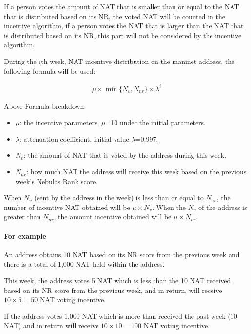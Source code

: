 If a person votes the amount of NAT that is smaller than or equal to the NAT that is distributed based on its NR, the voted NAT will be counted in the incentive algorithm, if a person votes the NAT that is larger than the NAT that is distributed based on its NR, this part will not be considered by the incentive algorithm.

During the $i$th week, NAT incentive distribution on the maninet address, the following formula will be used:

\begin{align}
\mu \times \min \{N_{v}, N_{nr}\} \times \lambda^{i}
\end{align}

Above Formula breakdown:

\begin{itemize}
	\item $\mu$: the incentive parameters, $\mu$=10 under the initial parameters.
	\item $\lambda$: attenuation coefficient, initial value $\lambda$=0.997.
	\item $N_{v}$: the amount of NAT that is voted by the address during this week.
	\item $N_{nr}$: how much NAT the address will receive this week based on the previous week's Nebulas Rank score.
\end{itemize}

\noindent When $N_{v}$ (sent by the address in the week) is less than or equal
to $N_{nr}$, the number of incentive NAT obtained will be $\mu\times N_{v}$. When the $N_{v}$ of the address is greater than $N_{nr}$, the amount incentive obtained will be $\mu\times N_{nr}$.

\paragraph{For example}

An address obtains 10 NAT based on its NR score from the previous week and there is a total of 1,000 NAT held within the address.

This week, the address votes 5 NAT which is less than the 10 NAT received based on its NR score from the previous week, and in return, will receive $10\times5=50$ NAT voting incentive.

If the address votes 1,000 NAT which is more than received the past week (10 NAT) and in return will receive $10\times10=100$ NAT voting incentive.

\paragraph{}

